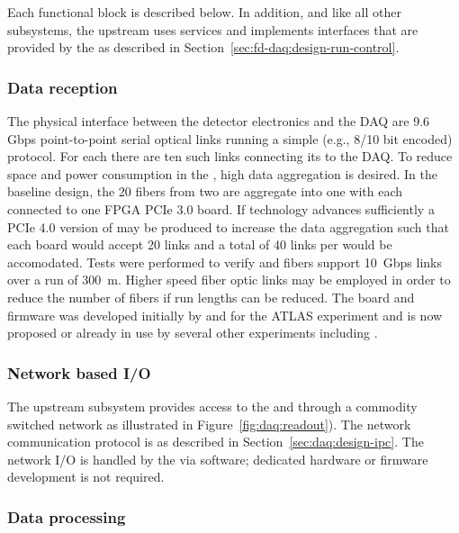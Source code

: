 Each functional block is described below.  In addition, and like all
other  subsystems, the upstream  uses services and implements interfaces that are provided by 
the  as described in Section~\ref{sec:fd-daq:design-run-control}.

\subsubsection{Data reception}
\label{sec:fd-daq:upstream-receiver}
The physical interface between the detector electronics and the DAQ are 9.6 Gbps point-to-point serial optical links running a simple (e.g., 8/10 bit encoded) protocol. 
For each  there are ten such links connecting its  to the DAQ.
To reduce space and power consumption in the , high data aggregation is desired.
In the baseline design, the 20 fibers from two  are aggregate into one  with each  connected to one  FPGA PCIe 3.0 board. 
If technology advances sufficiently a PCIe 4.0 version of  may be produced to increase the data aggregation such that each board would accept 20 links and a total of 40 links per  would be accomodated.
Tests were performed to verify  and  fibers support \SI{10}{Gbps} links over a run of \SI{300}{\meter}.
Higher speed fiber optic links may be employed in order to reduce the number of fibers if run lengths can be reduced.
The  board and firmware was developed initially by and for the ATLAS experiment and is now proposed or already in use by several other experiments including .

\subsubsection{Network based I/O}
\label{sec:fd-daq:upstream-io}

The upstream  subsystem provides access to the  and  through a commodity switched network as illustrated in Figure~\ref{fig:daq:readout}).
The network communication protocol is as described in Section~\ref{sec:daq:design-ipc}.
The network I/O is handled by the  via software; dedicated hardware or firmware development is not required.

\subsubsection{Data processing}
\label{sec:fd-daq:upstream-proc}

